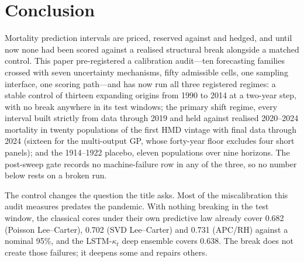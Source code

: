 \section{Conclusion}
\label{sec:conclusion}

Mortality prediction intervals are priced, reserved against and hedged,
and until now none had been scored against a realised structural break
alongside a matched control. This paper pre-registered a calibration
audit---ten forecasting families crossed with seven uncertainty
mechanisms, fifty admissible cells, one sampling interface, one scoring
path---and has now run all three registered regimes: a stable control of
thirteen expanding origins from 1990 to 2014 at a two-year step, with no
break anywhere in its test windows; the primary shift regime, every
interval built strictly from data through 2019 and held against realised
2020--2024 mortality in twenty populations of the first HMD vintage with
final data through 2024 (sixteen for the multi-output GP, whose forty-year
floor excludes four short panels); and the 1914--1922 placebo, eleven
populations over nine horizons. The post-sweep gate records no machine-failure row in
any of the three, so no number below rests on a broken run.

The control changes the question the title asks. Most of the
miscalibration this audit measures predates the pandemic. With nothing
breaking in the test window, the classical cores under their own
predictive law already cover 0.682 (Poisson Lee--Carter), 0.702 (SVD
Lee--Carter) and 0.731 (APC/RH) against a nominal 95\%, and the
LSTM-$\kappa_t$ deep ensemble covers 0.638. The break does not create
those failures; it deepens some and repairs others.

